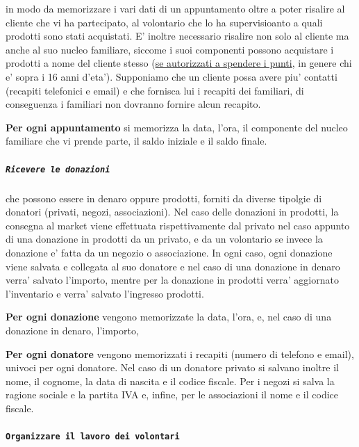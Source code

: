 \documentclass[]{article}
\let\oldparagraph\paragraph
\renewcommand{\paragraph}[1]{\oldparagraph{#1}\mbox{}}
\let\oldsubparagraph\subparagraph
\renewcommand{\subparagraph}[1]{\oldsubparagraph{#1}\mbox{}}
\begin{document}
in modo da memorizzare i vari dati di un appuntamento oltre a poter
risalire al cliente che vi ha partecipato, al volontario che lo ha
supervisioanto a quali prodotti sono stati acquistati. E' inoltre
necessario risalire non solo al cliente ma anche al suo nucleo
familiare, siccome i suoi componenti possono acquistare i prodotti a
nome del cliente stesso (\underline{se autorizzati a spendere i punti},
in genere chi e' sopra i 16 anni d'eta'). Supponiamo che un cliente
possa avere piu' contatti (recapiti telefonici e email) e che fornisca
lui i recapiti dei familiari, di conseguenza i familiari non dovranno
fornire alcun recapito.

\textbf{Per ogni appuntamento} si memorizza la data, l'ora, il
componente del nucleo familiare che vi prende parte, il saldo iniziale e
il saldo finale.

\hypertarget{ricevere-le-donazioni}{%
\subparagraph{\texorpdfstring{\texttt{Ricevere\ le\ donazioni}}{Ricevere le donazioni}}\label{ricevere-le-donazioni}}

che possono essere in denaro oppure prodotti, forniti da diverse
tipolgie di donatori (privati, negozi, associazioni). Nel caso delle
donazioni in prodotti, la consegna al market viene effettuata
rispettivamente dal privato nel caso appunto di una donazione in
prodotti da un privato, e da un volontario se invece la donazione e'
fatta da un negozio o associazione. In ogni caso, ogni donazione viene
salvata e collegata al suo donatore e nel caso di una donazione in
denaro verra' salvato l'importo, mentre per la donazione in prodotti
verra' aggiornato l'inventario e verra' salvato l'ingresso prodotti.

\textbf{Per ogni donazione} vengono memorizzate la data, l'ora, e, nel
caso di una donazione in denaro, l'importo,

\textbf{Per ogni donatore} vengono memorizzati i recapiti (numero di
telefono e email), univoci per ogni donatore. Nel caso di un donatore
privato si salvano inoltre il nome, il cognome, la data di nascita e il
codice fiscale. Per i negozi si salva la ragione sociale e la partita
IVA e, infine, per le associazioni il nome e il codice fiscale.

\hypertarget{organizzare-il-lavoro-dei-volontari}{%
\paragraph{\texorpdfstring{\texttt{Organizzare\ il\ lavoro\ dei\ volontari}}{Organizzare il lavoro dei volontari}}\label{organizzare-il-lavoro-dei-volontari}}
\end{document}
